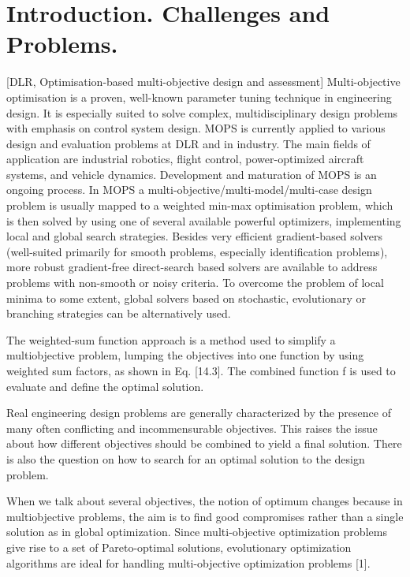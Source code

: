\chapter{Introduction. Challenges and Problems.}

[DLR, Optimisation-based multi-objective design and assessment] 
Multi-objective optimisation is a proven, well-known parameter tuning technique in engineering design. It is especially suited 
to solve complex, multidisciplinary design problems with emphasis on control system design.
MOPS is currently applied to various design and evaluation problems at DLR and in industry. The main fields 
of application are industrial robotics, flight control, power-optimized aircraft systems, and vehicle dynamics. Development and maturation of MOPS is an ongoing process.
In MOPS a multi-objective/multi-model/multi-case design problem is usually mapped to a weighted min-max optimisation problem, which is then solved by using one of several 
available powerful optimizers, implementing local and global search strategies. Besides very efficient gradient-based solvers (well-suited primarily for smooth problems, 
especially identification problems), more robust gradient-free direct-search based solvers are available to address problems with non-smooth or noisy criteria. To overcome the 
problem of local minima to some extent, global solvers based on stochastic, evolutionary or branching strategies can be alternatively used.

The weighted-sum function approach is a method used to simplify a multiobjective problem, lumping the objectives into 
one function by using weighted sum factors, as shown in Eq. [14.3]. The combined function f is used to evaluate and define the optimal solution.

Real engineering design problems are generally characterized by the presence of many
often conflicting and incommensurable objectives. This raises the issue about how
different objectives should be combined to yield a final solution. There is also the
question on how to search for an optimal solution to the design problem. 

When we talk about several objectives, the notion of optimum changes because in multiobjective problems, the aim is to find good compromises rather than a single solution as in global optimization.
Since multi-objective optimization problems give rise to a set of Pareto-optimal solutions, evolutionary 
optimization algorithms are ideal for handling multi-objective optimization problems [1].

